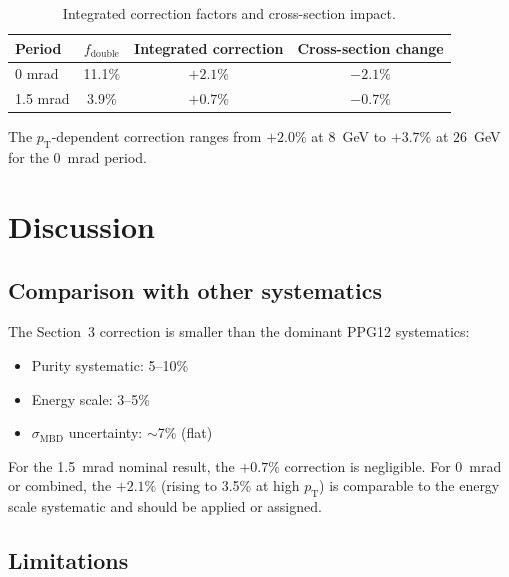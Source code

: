 \documentclass[11pt,letterpaper]{article}
\newcommand{\pT}{\ensuremath{p_{\text{T}}}}
\newcommand{\fdouble}{\ensuremath{f_{\text{double}}}}
\begin{document}
\begin{table}[htbp]
\centering
\caption{Integrated correction factors and cross-section impact.}
\label{tab:impact}
\begin{tabular}{lccc}
\toprule
\textbf{Period} & $\fdouble$ & \textbf{Integrated correction}
  & \textbf{Cross-section change} \\
\midrule
0 mrad    & 11.1\% & $+2.1\%$ & $-2.1\%$ \\
1.5 mrad  & 3.9\%  & $+0.7\%$ & $-0.7\%$ \\
\bottomrule
\end{tabular}
\end{table}

The $\pT$-dependent correction ranges from $+2.0\%$ at $8$~GeV to
$+3.7\%$ at $26$~GeV for the 0~mrad period.

\section{Discussion}
\label{sec:discussion}

\subsection{Comparison with other systematics}

The Section~3 correction is smaller than the dominant PPG12
systematics:
\begin{itemize}
  \item Purity systematic: 5--10\%
  \item Energy scale: 3--5\%
  \item $\sigma_\text{MBD}$ uncertainty: $\sim$7\% (flat)
\end{itemize}

For the 1.5~mrad nominal result, the $+0.7\%$ correction is
negligible. For 0~mrad or combined, the $+2.1\%$ (rising to
3.5\% at high $\pT$) is comparable to the energy scale
systematic and should be applied or assigned.

\subsection{Limitations}
\end{document}
